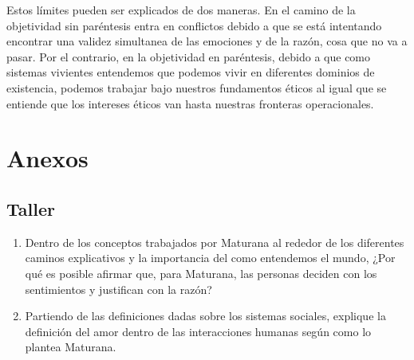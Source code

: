 \documentclass[10pt]{article}
\begin{document}
        Estos límites pueden ser explicados de dos maneras. En el camino de la objetividad sin paréntesis entra en conflictos debido a que se está intentando encontrar una validez simultanea de las emociones y de la razón, cosa que no va a pasar. Por el contrario, en la objetividad en paréntesis, debido a que como sistemas vivientes entendemos que podemos vivir en diferentes dominios de existencia, podemos trabajar bajo nuestros fundamentos éticos al igual que se entiende que los intereses éticos van hasta nuestras fronteras operacionales. 


    \section{Anexos}

    \subsection{Taller}

        \begin{enumerate}
            \item Dentro de los conceptos trabajados por Maturana al rededor de los diferentes caminos explicativos y la importancia del como entendemos el mundo, ¿Por qué es posible afirmar que, para Maturana, las personas deciden con los sentimientos y justifican con la razón?
            \item Partiendo de las definiciones dadas sobre los sistemas sociales, explique la definición del amor dentro de las interacciones humanas según como lo plantea Maturana.
        \end{enumerate}
\end{document}
